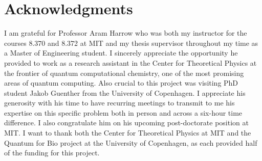 

\chapter*{Acknowledgments}

I am grateful for Professor Aram Harrow who was both my instructor for the courses 8.370 and 8.372 at MIT and my thesis supervisor throughout my time as a Master of Engineering student. I sincerely appreciate the opportunity he provided to work as a research assistant in the Center for Theoretical Physics at the frontier of quantum computational chemistry, one of the most promising areas of quantum computing. Also crucial to this project was visiting PhD student Jakob Guenther from the University of Copenhagen. I appreciate his generosity with his time to have recurring meetings to transmit to me his expertise on this specific problem both in person and across a six-hour time difference. I also congratulate him on his upcoming post-doctorate position at MIT. I want to thank both the Center for Theoretical Physics at MIT and the Quantum for Bio project at the University of Copenhagen, as each provided half of the funding for this project.
